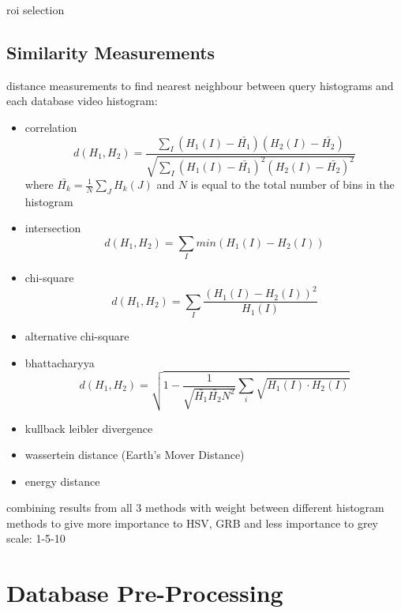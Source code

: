 roi selection

\subsection{Similarity Measurements}

distance measurements to find nearest neighbour between query histograms and each database video histogram:

\begin{itemize}
    \item correlation
    \begin{equation}
        d(H_1,H_2)=\frac{\sum _I(H_1(I)-\bar{H_1})(H_2(I)-\bar{H_2})}{\sqrt{\sum _I(H_1(I)-\bar{H_1})^2(H_2(I)-\bar{H_2})^2}}
    \end{equation}
    where $\bar{H_k}=\frac{1}{N}\sum_JH_k(J)$ and $N$ is equal to the total number of bins in the histogram
    \item intersection
    \begin{equation}
        d(H_1,H_2)=\sum_Imin(H_1(I)-H_2(I))
    \end{equation}
    \item chi-square
    \begin{equation}
        d(H_1,H_2)=\sum_I\frac{(H_1(I)-H_2(I))^2}{H_1(I)}
    \end{equation}
    \item alternative chi-square
    \item bhattacharyya
    \begin{equation}
        d(H_1,H_2)=\sqrt{1-\frac{1}{\sqrt{\bar{H_1}\bar{H_2}N^2}}\sum_i\sqrt{H_1(I)\cdot H_2(I)}}
    \end{equation}
    \item kullback leibler divergence
    \item wassertein distance (Earth's Mover Distance)
    \item energy distance
\end{itemize}

combining results from all 3 methods with weight between different histogram methods to give more importance to HSV, GRB and less importance to grey scale: 1-5-10


\section{Database Pre-Processing}

